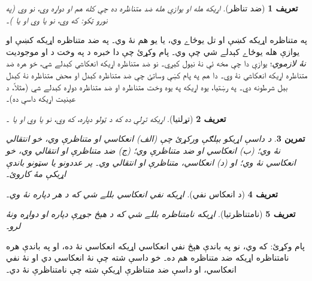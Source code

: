 \documentclass[12pt,a4paper,oneside]{report}
\newenvironment{explain}{}{}
\newtheorem{defn}{تعريف}[section]
\newtheorem{prob}[defn]{تمرين}
\begin{document}
\begin{defn}[ضد تناظر]
اړيکه  هله او يوازې هله \emph{ضد متناظره} ده چې
کله هم  او  دواړه وي، نو  وي (په نورو ټکو: که
 وي، نو يا  وي او يا )۔
\end{defn}

\begin{explain}
په متناظره اړيکه کښې  او  تل يوځاے وي، يا يو هم نۀ وي۔
په ضد متناظره اړيکه کښې  او  يوازې هله يوځاے کېدلے شي
چې  وي۔ پام وکړئ چې دا خبره د  په وخت د  او
 موجوديت \emph{نۀ لازموي}؛ يوازې دا چې مخه ئې نۀ نيول کېږي۔
نو ضد متناظره اړيکه انعکاسي کېدلے شي، خو هره ضد متناظره اړيکه
انعکاسي نۀ وي۔ دا هم په پام کښې وساتئ چې ضد متناظره کېدل او محض
متناظره نۀ کېدل بېل شرطونه دي۔ په رښتيا، يوه اړيکه په يوه وخت
متناظره او ضد متناظره دواړه کېدلے شي (مثلاً، د عينيت اړيکه داسې ده)۔
\end{explain}

\begin{defn}[تړلتيا]
اړيکه  \emph{تړلې} ده که د ټولو 
دپاره، که  وي، نو يا  وي او يا ۔
\end{defn}

\begin{prob}
د داسې اړيکو بېلګې ورکړئ چې (الف) انعکاسي او متناظرې وي، خو انتقالي
نۀ وي؛ (ب) انعکاسي او ضد متناظرې وي؛ (ج) ضد متناظرې او انتقالي وي،
خو انعکاسي نۀ وي؛ او (د) انعکاسي، متناظرې او انتقالي وي۔ پر عددونو
يا سټونو باندې اړيکې مۀ کاروئ۔
\end{prob}

\begin{defn}[د انعکاس نفي]
اړيکه  \emph{نفي انعکاسي} بللے شي که د هر
 دپاره  نۀ وي۔
\end{defn}

\begin{defn}[نامتناظرتيا]
اړيکه  \emph{نامتناظره} بللے شي که د هېڅ جوړې
 دپاره  او  دواړه ونۀ لرو۔
\end{defn}

پام وکړئ: که  وي، نو په  باندې هېڅ نفي انعکاسي
اړيکه انعکاسي نۀ ده، او په  باندې هره نامتناظره اړيکه ضد متناظره
هم ده۔ خو داسې  شته چې نۀ انعکاسي دي او نۀ نفي
انعکاسي، او داسې ضد متناظرې اړيکې شته چې نامتناظرې نۀ دي۔
\end{document}
